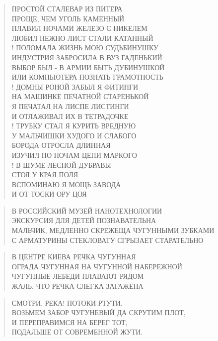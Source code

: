 \poemtitle{***}
\begin{verse}
ПРОСТОЙ СТАЛЕВАР ИЗ ПИТЕРА\\
ПРОЩЕ, ЧЕМ УГОЛЬ КАМЕННЫЙ\\
ПЛАВИЛ НОЧАМИ ЖЕЛЕЗО С НИКЕЛЕМ\\
ЛЮБИЛ НЕЖНО ЛИСТ СТАЛИ КАТАННЫЙ\\!
ПОЛОМАЛА ЖИЗНЬ МОЮ СУДЬБИНУШКУ\\
ИНДУСТРИЯ ЗАБРОСИЛА В ВУЗ ГАДЕНЬКИЙ\\
ВЫБОР БЫЛ - В АРМИИ БЫТЬ ДУБИНУШКОЙ\\
ИЛИ КОМПЬЮТЕРА ПОЗНАТЬ ГРАМОТНОСТЬ\\!
ДОМНЫ РОНОЙ ЗАБЫЛ Я ФИТИНГИ\\
НА МАШИНКЕ ПЕЧАТНОЙ СТАРЕНЬКОЙ\\
Я ПЕЧАТАЛ НА ЛИСПЕ ЛИСТИНГИ\\
И ОТЛАЖИВАЛ ИХ В ТЕТРАДОЧКЕ\\!
ТРУБКУ СТАЛ Я КУРИТЬ ВРЕДНУЮ\\
У МАЛЬЧИШКИ ХУДОГО И СЛАБОГО\\
БОРОДА ОТРОСЛА ДЛИННАЯ \\
ИЗУЧИЛ ПО НОЧАМ ЦЕПИ МАРКОГО\\!
В ШУМЕ ЛЕСНОЙ ДУБРАВЫ\\
СТОЯ У КРАЯ ПОЛЯ\\
ВСПОМИНАЮ Я МОЩЬ ЗАВОДА\\
И ОТ ТОСКИ ОРУ ЦОЯ
\end{verse}

\poemtitle{***}
\begin{verse}
В РОССИЙСКИЙ МУЗЕЙ НАНОТЕХНОЛОГИИ\\
ЭКСКУРСИЯ ДЛЯ ДЕТЕЙ ПОЗНАВАТЕЛЬНА\\
МАЛЬЧИК, МЕДЛЕННО СКРЕЖЕЩА ЧУГУННЫМИ ЗУБКАМИ\\
С АРМАТУРИНЫ СТЕКЛОВАТУ СГРЫЗАЕТ СТАРАТЕЛЬНО
\end{verse}

\poemtitle{***}
\begin{verse}
В ЦЕНТРЕ КИЕВА РЕЧКА ЧУГУННАЯ\\
ОГРАДА ЧУГУННАЯ НА ЧУГУННОЙ НАБЕРЕЖНОЙ\\
ЧУГУННЫЕ ЛЕБЕДИ ПЛАВАЮТ РЯДОМ\\
ЖАЛЬ, ЧТО РЕЧКА СЛЕГКА ЗАГАЖЕНА
\end{verse}

\poemtitle{***}
\begin{verse}
СМОТРИ, РЕКА! ПОТОКИ РТУТИ.\\
ВОЗЬМЕМ ЗАБОР ЧУГУНЕВЫЙ ДА СКРУТИМ ПЛОТ,\\
И ПЕРЕПРАВИМСЯ НА БЕРЕГ ТОТ,\\
ПОДАЛЬШЕ ОТ СОВРЕМЕННОЙ ЖУТИ.
\end{verse}

